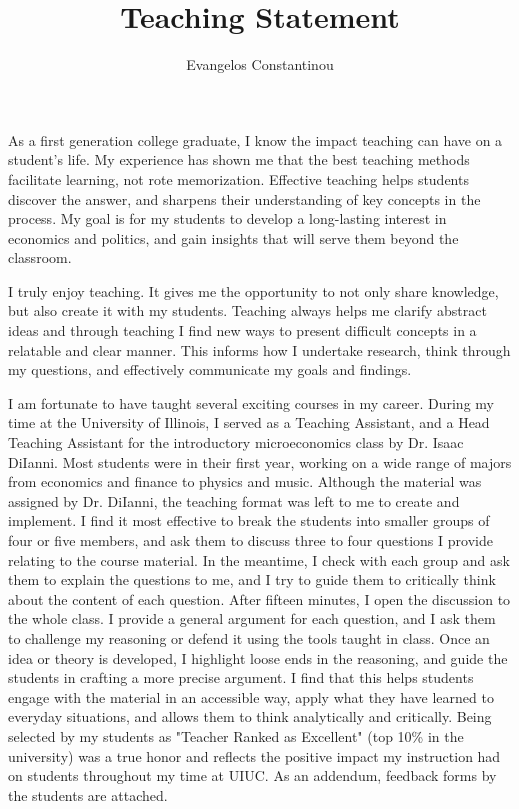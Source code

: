 \documentclass[12pt]{article}
\author{Evangelos Constantinou}
\date{}
\title{\bf{Teaching Statement}}
\begin{document}
\maketitle
As a first generation college graduate, I know the impact teaching can have on a student's life.
My experience has shown me that the best teaching methods facilitate learning, not rote memorization.
Effective teaching helps students discover the answer, and sharpens their understanding of key concepts in the process.
My goal is for my students to develop a long-lasting interest in economics and politics,
and gain insights that will serve them beyond the classroom.

I truly enjoy teaching.
It gives me the opportunity to not only share knowledge, but also create it with my students.
Teaching always helps me clarify abstract ideas and through teaching I find new ways to present difficult concepts in a relatable and clear manner.
This informs how I undertake research, think through my questions, and effectively communicate my goals and findings.

I am fortunate to have  taught several exciting  courses in my career.
During my time at the University of Illinois, I served as a Teaching Assistant, and a Head Teaching Assistant for the introductory microeconomics class by Dr. Isaac DiIanni.
Most students were in their first year, working on a wide range of majors from economics and finance to physics and music.
Although the material was assigned by Dr. DiIanni, the teaching format was left to me to create and implement.
I find it most effective to break the students into smaller groups of four or five members,
and ask them to discuss three to four questions I provide relating to the course material.
In the meantime, I check with each group and ask them to explain the questions to me, and I try to guide them to critically think about the content of each question.
After fifteen minutes, I open the discussion to the whole class.
I provide a general argument for each question, and I ask them to challenge my reasoning or defend it using the tools taught in class.
Once an idea or theory is developed, I highlight loose ends in the reasoning, and guide the students in crafting a more precise argument.
I find that this helps students engage with the material in an accessible way,
apply what they have learned to everyday situations,
and allows them to think analytically and critically.
Being selected by my students as "Teacher Ranked as Excellent" (top 10\% in the university) was a true honor and reflects the positive impact my instruction had on students throughout my time at UIUC.
As an addendum, feedback forms by the students are attached. 
\end{document}
